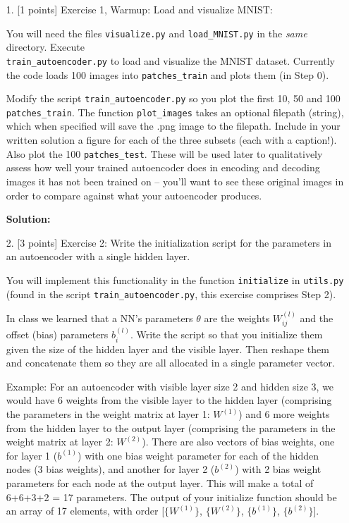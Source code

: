 \documentclass[10pt]{article}
\begin{document}
\newpage
\begin{itemize}



\item[1.] [1 points]  Exercise 1, Warmup: Load and visualize MNIST:  

You will need the files {\tt visualize.py} and {\tt load\_MNIST.py} in the {\em same} directory.
Execute \\{\tt train\_autoencoder.py} to load and visualize the MNIST dataset.  
Currently the code loads 100 images into {\tt patches\_train} and plots them (in Step 0).

Modify the script {\tt train\_autoencoder.py} so you plot the first 10, 50 and 100 {\tt patches\_train}.  The function {\tt plot\_images} takes an optional filepath (string), which when specified will save the .png image to the filepath.  Include in your written solution a figure for each of the three subsets (each with a caption!).  Also plot the 100 {\tt patches\_test}.  These will be used later to qualitatively assess how well your trained autoencoder does in encoding and decoding images it has not been trained on -- you'll want to see these original images in order to compare against what your autoencoder produces.

{\bf Solution:}



\item[2.] [3 points]
Exercise 2:  
Write the initialization script for the parameters in an autoencoder with a single hidden layer.

You will implement this functionality in the function {\tt initialize} in {\tt utils.py}  \\
(found in the script {\tt train\_autoencoder.py}, this exercise comprises Step 2).

In class we learned that a NN's parameters $\theta$ are the weights $W_{ij}^{(l)}$ and the offset (bias) parameters $b_i^{(l)}$.  Write the script so that you initialize them given the size of the hidden layer and the visible layer. 	
Then reshape them and concatenate them so they are all allocated in a single parameter vector.  

Example: For an autoencoder with visible layer size 2 and hidden size 3, we would have 6 weights from the visible layer to the hidden layer (comprising the parameters in the weight matrix at layer 1: $W^{(1)}$) and 6 more weights from the hidden layer to the output layer (comprising the parameters in the weight matrix at layer 2: $W^{(2)}$).  There are also vectors of bias weights, one for layer 1 ($b^{(1)}$) with one bias weight parameter for each of the hidden nodes (3 bias weights), and another for layer 2 ($b^{(2)}$) with 2 bias weight parameters for each node at the output layer. This will make a total of 6+6+3+2 = 17 parameters. The output of your initialize function should be an array of 17 elements, with order [$\{W^{(1)}\}$, $\{W^{(2)}\}$, $\{b^{(1)}\}$, $\{b^{(2)}\}$].  


\end{itemize}
\end{document}
